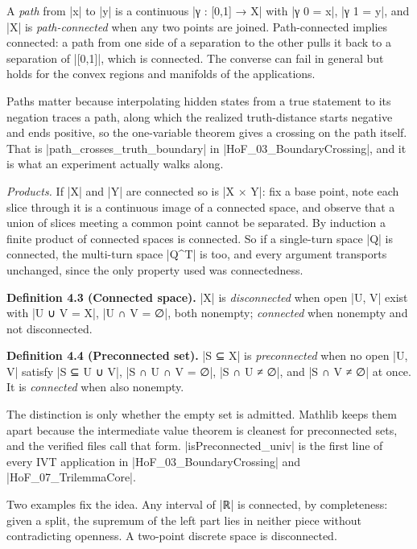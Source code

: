 \documentclass{memoir}
\begin{document}
A \emph{path} from \LeanVerb|x| to \LeanVerb|y| is a continuous \LeanVerb|γ : [0,1] → X| with \LeanVerb|γ 0 = x|, \LeanVerb|γ 1 = y|,
and \LeanVerb|X| is \emph{path-connected} when any two points are joined. Path-connected
implies connected: a path from one side of a separation to the other pulls it
back to a separation of \LeanVerb|[0,1]|, which is connected. The converse can fail in
general but holds for the convex regions and manifolds of the applications.

Paths matter because interpolating hidden states from a true statement to its
negation traces a path, along which the realized truth-distance starts negative
and ends positive, so the one-variable theorem gives a crossing on the path
itself. That is \LeanVerb|path_crosses_truth_boundary| in \LeanVerb|HoF_03_BoundaryCrossing|, and
it is what an experiment actually walks along.

\emph{Products.} If \LeanVerb|X| and \LeanVerb|Y| are connected so is \LeanVerb|X × Y|: fix a base point, note
each slice through it is a continuous image of a connected space, and observe
that a union of slices meeting a common point cannot be separated. By induction
a finite product of connected spaces is connected. So if a single-turn space \LeanVerb|Q|
is connected, the multi-turn space \LeanVerb|Q^T| is too, and every argument transports
unchanged, since the only property used was connectedness.

\textbf{Definition 4.3 (Connected space).} \LeanVerb|X| is \emph{disconnected} when open \LeanVerb|U, V| exist with
\LeanVerb|U ∪ V = X|, \LeanVerb|U ∩ V = ∅|, both nonempty; \emph{connected} when nonempty and not
disconnected.

\textbf{Definition 4.4 (Preconnected set).} \LeanVerb|S ⊆ X| is \emph{preconnected} when no open \LeanVerb|U, V|
satisfy \LeanVerb|S ⊆ U ∪ V|, \LeanVerb|S ∩ U ∩ V = ∅|, \LeanVerb|S ∩ U ≠ ∅|, and \LeanVerb|S ∩ V ≠ ∅| at once. It
is \emph{connected} when also nonempty.

The distinction is only whether the empty set is admitted. Mathlib keeps them
apart because the intermediate value theorem is cleanest for preconnected sets,
and the verified files call that form. \LeanVerb|isPreconnected_univ| is the first line
of every IVT application in \LeanVerb|HoF_03_BoundaryCrossing| and \LeanVerb|HoF_07_TrilemmaCore|.

Two examples fix the idea. Any interval of \LeanVerb|ℝ| is connected, by completeness:
given a split, the supremum of the left part lies in neither piece without
contradicting openness. A two-point discrete space is disconnected.
\end{document}
